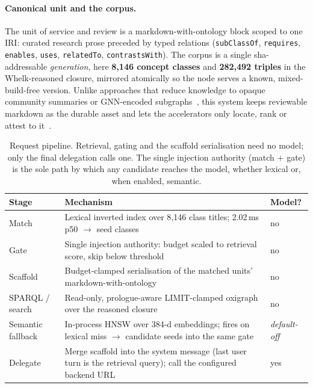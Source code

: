 \documentclass[10pt,twocolumn]{article}
\begin{document}
\paragraph{Canonical unit and the corpus.} The unit of service and review is a markdown-with-ontology block scoped to one IRI: curated research prose preceded by typed relations (\texttt{subClassOf}, \texttt{requires}, \texttt{enables}, \texttt{uses}, \texttt{relatedTo}, \texttt{contrastsWith}). The corpus is a single sha-addressable \emph{generation}, here \textbf{8{,}146 concept classes} and \textbf{282{,}492 triples} in the Whelk-reasoned closure, mirrored atomically so the node serves a known, mixed-build-free version. Unlike approaches that reduce knowledge to opaque community summaries or GNN-encoded subgraphs~\cite{edge2024graphrag,he2024gretriever}, this system keeps reviewable markdown as the durable asset and lets the accelerators only locate, rank or attest to it~\cite{garcez2023neurosymbolic}.

\begin{table}[t]\centering\small
\caption{Request pipeline. Retrieval, gating and the scaffold serialisation need no model; only
the final delegation calls one. The single injection authority (match $+$ gate) is the sole path by
which any candidate reaches the model, whether lexical or, when enabled, semantic.}
\label{tab:pipeline}
\renewcommand{\arraystretch}{1.15}
\begin{tabularx}{\textwidth}{@{}>{\raggedright\arraybackslash}p{2.7cm} >{\raggedright\arraybackslash}X >{\centering\arraybackslash}p{2.2cm}@{}}
\toprule
Stage & Mechanism & Model? \\
\midrule
Match & Lexical inverted index over 8{,}146 class titles; 2.02\,ms p50 $\to$ seed classes & no \\
Gate & Single injection authority: budget scaled to retrieval score, skip below threshold & no \\
Scaffold & Budget-clamped serialisation of the matched units' markdown-with-ontology & no \\
SPARQL / search & Read-only, prologue-aware LIMIT-clamped oxigraph over the reasoned closure & no \\
Semantic fallback & In-process HNSW over 384-d embeddings; fires on lexical miss $\to$ candidate seeds into the same gate & \emph{default-off} \\
Delegate & Merge scaffold into the system message (last user turn is the retrieval query); call the configured backend URL & yes \\
\bottomrule
\end{tabularx}
\end{table}
\end{document}

